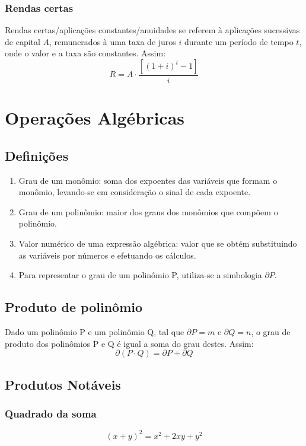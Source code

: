 \documentclass{article}
\begin{document}
\subsubsection{Rendas certas}
Rendas certas/aplicações constantes/anuidades se referem à aplicações sucessivas de capital $A$, remunerados à uma taxa de juros $i$ durante um período de tempo $t$, onde o valor e a taxa são constantes. Assim:
\begin{equation*}
    R=A\cdot\dfrac{[(1+i)^t-1]}{i}
\end{equation*}

\section{Operações Algébricas}
\subsection{Definições}
\begin{enumerate}[\quad\quad$\bullet$]
    \item Grau de um monômio: soma dos expoentes das variáveis que formam o monômio, levando-se em consideração o sinal de cada expoente.
    \item Grau de um polinômio: maior dos graus dos monômios que compõem o polinômio.
    \item Valor numérico de uma expressão algébrica: valor que se obtém substituindo as variáveis por números e efetuando os cálculos. 
    \item Para representar o grau de um polinômio P, utiliza-se a simbologia $\partial P$.
\end{enumerate}

\subsection{Produto de polinômio}
Dado um polinômio P e um polinômio Q, tal que $\partial P=m$ e $\partial Q=n$, o grau de produto dos polinômios P e Q é igual a soma do grau destes. Assim: 
\begin{equation*}
    \partial(P\cdot Q)=\partial P + \partial Q
\end{equation*}

\subsection{Produtos Notáveis}
\subsubsection{Quadrado da soma}
\begin{equation*}
    (x+y)^2=x^2+2xy+y^2
\end{equation*}
\end{document}
